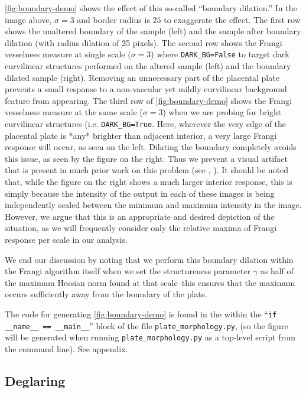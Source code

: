 	\cref{fig:boundary-demo} shows the effect of this so-called ``boundary dilation.'' 
	In the image above, $\sigma=3$ and border radius is $25$ to exaggerate the effect.
	The first row shows the unaltered boundary of the sample (left) and
		the sample after boundary dilation (with radius dilation of 25 pixels).
	The second row shows the Frangi vesselness measure at single scale ($\sigma=3$) where \texttt{DARK\_BG=False} to target dark curvilinear structures performed on the altered sample (left) and the boundary dilated sample (right). Removing an unnecessary part of
	the placental plate prevents a small response to a non-vascular yet mildly curvilinear
	background feature from appearing.
	The third row of \cref{fig:boundary-demo} shows the Frangi vesselness measure at the same scale ($\sigma=3$) when we are probing for bright curvilinear structures (i.e.
	\texttt{DARK\_BG=True}. Here, wherever the very edge of the placental plate is *any* brighter than adjacent interior, a very large Frangi response will occur, as seen on the left. Dilating the boundary completely avoids this issue, as seen by the figure on the right. Thus we prevent a visual artifact that is present in much prior work on this problem (see \cite{huynh2013filter}, \cite{almoussa-ucla-reu}).
	It should be noted that, while the figure on the right shows a much larger interior response, this is simply because the intensity of the output in each of these
	images is being independently scaled between the minimum and maximum intensity in the image. However, we argue that this is an appropriate and desired depiction of the situation, as we will frequently consider only the relative maxima of Frangi response per scale in our analysis.
	
	We end our discussion by noting that we perform this boundary dilation within the
	Frangi algorithm itself when we set the structureness parameter $\gamma$ as half of the maximum Hessian norm found at that scale--this ensures that the maximum occurs sufficiently away from the boundary of the plate.
	
	The code for generating \cref{fig:boundary-demo} is found in the within the ``\texttt{if \_\_name\_\_ == \_\_main\_\_}'' block of the file \texttt{plate\_morphology.py},
	(so the figure will be generated when running \texttt{plate\_morphology.py} as a top-level script from the command line). See appendix.
	
	\subsection{Deglaring}
	
